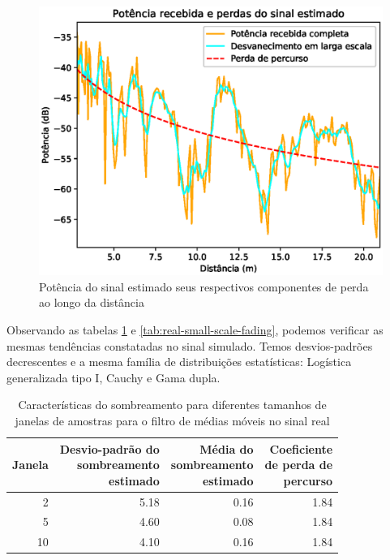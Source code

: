 \documentclass[journal,11pt,twocolumn]{IEEEtran}
\begin{document}
\begin{figure}[h!]
    \centering
    \includegraphics[scale=0.55]{trial1_real_world_prx_estimated.eps}
    \caption{Potência do sinal estimado seus respectivos componentes de perda ao longo da distância}
    \label{fig:real-trial1}
\end{figure}

Observando as tabelas \ref{tab:real-shadowing} e \ref{tab:real-small-scale-fading}, podemos verificar as mesmas tendências constatadas no sinal simulado. Temos desvios-padrões decrescentes e a mesma família de distribuições estatísticas: Logística generalizada tipo I, Cauchy e Gama dupla.

\begin{table}[h!]
    \centering
    \begin{tabular}{r|r|r|r}
        Janela & \makecell[r]{Desvio-padrão do\\sombreamento\\estimado} & \makecell[r]{Média do\\ sombreamento\\estimado} & \makecell[r]{Coeficiente\\ de perda de \\ percurso}\\
        \hline
        2  & 5.18 & 0.16 & 1.84\\
        5  & 4.60 & 0.08 & 1.84\\
        10 & 4.10 & 0.16 & 1.84\\
    \end{tabular}
    \caption{Características do sombreamento para diferentes tamanhos de janelas de amostras para o filtro de médias móveis no sinal real}
    \label{tab:real-shadowing}
\end{table}
\end{document}
